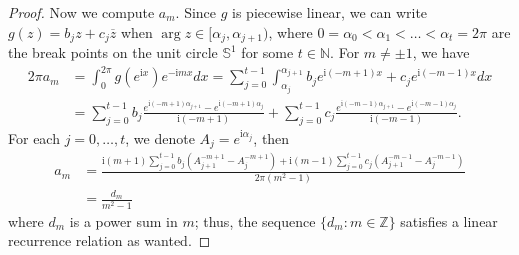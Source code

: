 \documentclass[10pt,a4paper]{amsart}
\newcommand{\irm}{\mathrm{i}}
\begin{document}
\begin{proof}
Now we compute $a_m$. Since $g$ is piecewise linear, we can write 
$g(z)=b_jz+c_j\overline{z}$ when $\arg z\in[\alpha_j,\alpha_{j+1})$, where $0=\alpha_0<\alpha_1<\ldots<\alpha_{t}=2\pi$ are the break points on the unit circle $\mathbb S^1$ for some $t\in\mathbb N$. For $m\neq\pm1$, we have
\begin{align*}
  2\pi a_{m}&=\int_{0}^{2\pi}g(e^{\irm x})e^{-\irm m x}dx=\sum_{j=0}^{t-1}\int_{\alpha_j}^{\alpha_{j+1}}b_je^{\irm  (-m+1)x}+c_je^{\irm  (-m-1)x}dx\\&=\sum_{j=0}^{t-1}b_j\frac{e^{\irm (-m+1)\alpha_{j+1}}-e^{\irm (-m+1)\alpha_{j}}}{\irm(-m+1)}+\sum_{j=0}^{t-1}c_j\frac{e^{\irm (-m-1)\alpha_{j+1}}-e^{\irm (-m-1)\alpha_{j}}}{\irm(-m-1)}.
\end{align*}
For each $j=0,\ldots,t$, we denote $A_j=e^{\irm \alpha_j}$, then\begin{align*}
    a_{m}&=\frac{\irm(m+1)\sum_{j=0}^{t-1}b_j(A_{j+1}^{-m+1}-A_j^{-m+1})+\irm(m-1)\sum_{j=0}^{t-1}c_j(A_{j+1}^{-m-1}-A_j^{-m-1})}{2\pi(m^2-1)}\\
    &=\frac{d_m}{m^2-1}
\end{align*}
where $d_m$ is a power sum in $m$; thus, the sequence $\{d_m:m\in\mathbb Z\}$ satisfies a linear recurrence relation as wanted.
\end{proof}
\end{document}
